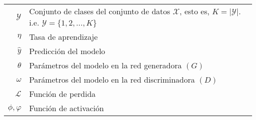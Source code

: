 \begin{table}[H]
\begin{center}
\begin{tabularx}{\textwidth}{|r|X|}
            $ \mathcal{Y} $                                                                  & Conjunto de clases del conjunto de datos $\mathcal{X}$, esto es, $\textit{K} = \lvert \mathcal{Y} \rvert$. \newline i.e. \scriptsize{${ \mathcal{Y} = \{1,2,...,\textit{K}\}}$} \\
            $ \eta $                                                                         & Tasa de aprendizaje                                                                                                                                                             \\
            $ \hat{y} $                                                                      & Predicción del modelo                                                                                                                                                           \\
            $ \theta $                                                                       & Parámetros del modelo en la red generadora $(G)$                                                                                                                                \\
            $ \omega $                                                                       & Parámetros del modelo en la red discriminadora $(D)$                                                                                                                            \\
            $ \mathcal{L} $                                                                  & Función de perdida                                                                                                                                                              \\
            $ \phi ,\varphi $                                                                & Función de activación                                                                                                                                                           \\

\end{tabularx}
\end{center}
\end{table}
